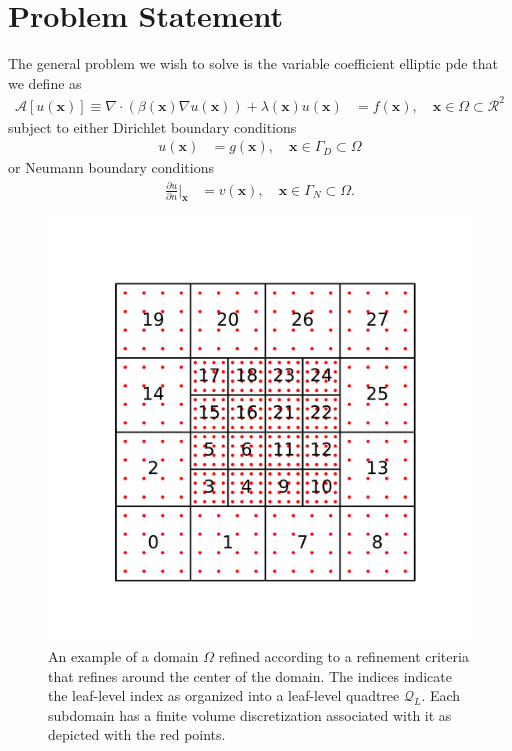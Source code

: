 \section{Problem Statement}
\label{sec:problem-statement}

The general problem we wish to solve is the variable coefficient elliptic \gls{pde} that we define as
\begin{align}
    \label{eq:elliptic-pde}
    \mathcal{A}[u(\textbf{x})] \equiv \nabla \cdot \left( \beta(\textbf{x}) \nabla u(\textbf{x}) \right) + \lambda(\textbf{x}) u(\textbf{x}) &= f(\textbf{x}), \quad \textbf{x} \in \Omega \subset \mathcal{R}^2
\end{align}
subject to either Dirichlet boundary conditions
\begin{align}
    \label{eq:elliptic-pde-bc1}
    u(\textbf{x}) &= g(\textbf{x}), \quad \textbf{x} \in \Gamma_D \subset \Omega
\end{align}
or Neumann boundary conditions
\begin{align}
    \label{eq:elliptic-pde-bc2}
    \frac{\partial u}{\partial n} \Big|_{\textbf{x}} &= v(\textbf{x}), \quad \textbf{x} \in \Gamma_N \subset \Omega.
\end{align}

\begin{figure}
    \centering
    \includegraphics[width=\textwidth, clip=true, trim={0 160 0 160}]{figures/adaptive-mesh-serial.pdf}
    \caption{An example of a domain $\Omega$ refined according to a refinement criteria that refines around the center of the domain. The indices indicate the leaf-level index as organized into a leaf-level quadtree $\mathcal{Q}_L$. Each subdomain has a finite volume discretization associated with it as depicted with the red points.}
    \label{fig:adaptive-mesh-serial}
\end{figure}

